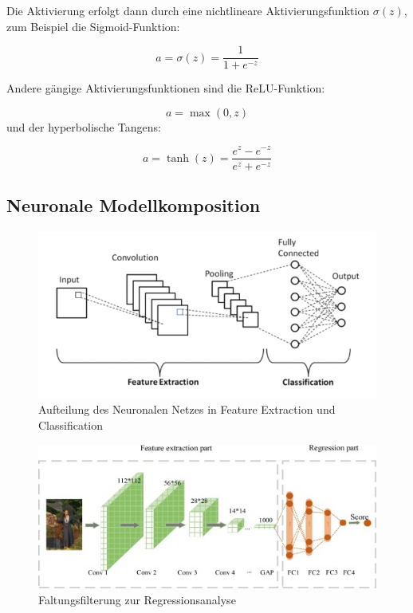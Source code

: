 Die Aktivierung erfolgt dann durch eine nichtlineare Aktivierungsfunktion $\sigma(z)$, zum Beispiel die Sigmoid-Funktion:

\begin{equation}
    a = \sigma(z) = \frac{1}{1 + e^{-z}}
\end{equation}

Andere gängige Aktivierungsfunktionen sind die ReLU-Funktion:

\begin{equation}
    a = \max(0, z)
\end{equation}
und der hyperbolische Tangens:

\begin{equation}
    a = \tanh(z) = \frac{e^z - e^{-z}}{e^z + e^{-z}}
\end{equation}
\subsection{Neuronale Modellkomposition}
\begin{figure}
    \centering
    \includegraphics[width=1\linewidth]{1_-FR6rFrKXktjxwDTlGofPQ.png}
    \caption{Aufteilung des Neuronalen Netzes in Feature Extraction und Classification}
    \label{fig:enter-label}
\end{figure}
\begin{figure}
    \centering
    \includegraphics[width=1\linewidth]{1-s2.0-S1047320322002280-gr2.jpg}
    \caption{Faltungsfilterung zur Regressionsanalyse}
    \label{fig:enter-label}
\end{figure}
